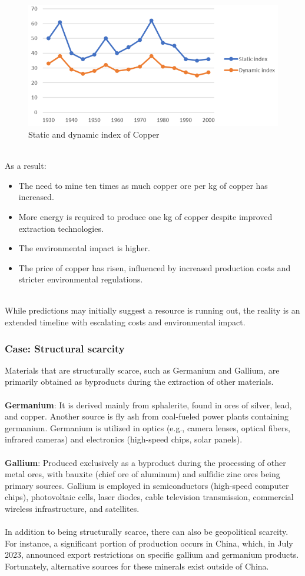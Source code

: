 \documentclass[../summary.tex]{subfiles}
\begin{document}
\begin{figure}[H]
	\centering
	\includegraphics[width=0.7\linewidth]{../images/static_dynamic_index_copper}
	\caption{Static and dynamic index of Copper}
	\label{fig:staticdynamicindexcopper}
\end{figure}
\ \\
As a result:
\begin{itemize} 
	\item The need to mine ten times as much copper ore per kg of copper has increased.
	\item More energy is required to produce one kg of copper despite improved extraction technologies.
	\item The environmental impact is higher.
	\item The price of copper has risen, influenced by increased production costs and stricter environmental regulations.
\end{itemize}
\ \\
While predictions may initially suggest a resource is running out, the reality is an extended timeline with escalating costs and environmental impact.

\subsubsection{Case: Structural scarcity}

Materials that are structurally scarce, such as Germanium and Gallium, are primarily obtained as byproducts during the extraction of other materials.\\
\\
\textbf{Germanium}: It is derived mainly from sphalerite, found in ores of silver, lead, and copper. Another source is fly ash from coal-fueled power plants containing germanium. Germanium is utilized in optics (e.g., camera lenses, optical fibers, infrared cameras) and electronics (high-speed chips, solar panels).\\
\\
\textbf{Gallium}: Produced exclusively as a byproduct during the processing of other metal ores, with bauxite (chief ore of aluminum) and sulfidic zinc ores being primary sources. Gallium is employed in semiconductors (high-speed computer chips), photovoltaic cells, laser diodes, cable television transmission, commercial wireless infrastructure, and satellites.\\
\\
In addition to being structurally scarce, there can also be geopolitical scarcity. For instance, a significant portion of production occurs in China, which, in July 2023, announced export restrictions on specific gallium and germanium products. Fortunately, alternative sources for these minerals exist outside of China.
\newpage
\end{document}
